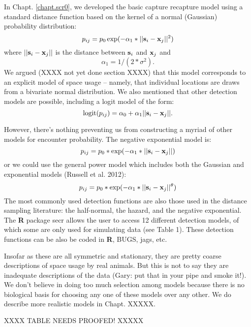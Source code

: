 In Chapt. \ref{chapt.scr0}, we developed the basic capture recapture model using  a
standard distance function based on the kernel of a normal (Gaussian) probability
distribution:
\[
p_{ij} = p_{0} \exp(-\alpha_{1} *||{\bf s}_{i}-{\bf x}_{j}||^2)
\]
where $||{\bf s}_{i}-{\bf x}_{j}||$ is the distance between ${\bf
  s}_{i}$ and ${\bf x}_{j}$ and
\[
\alpha_{1} = 1/(2*\sigma^2).
\]
We argued (XXXX not yet done section XXXX) that this model 
corresponds to an explicit model of space usage -- namely, that
individual locations are draws from a bivariate normal
distribution. We also mentioned that other detection models are
possible, including a logit model of the form:
\begin{equation}
	\mbox{logit}(p_{ij}) = \alpha_{0} + \alpha_1 ||{\bf s}_{i}-{\bf x}_{j} ||.
\label{covariates.eq.logit}
\end{equation}

However, there's nothing preventing us from constructing a myriad of
other models for encounter probability.
The negative exponential model is:
\[
p_{ij} = p_{0}*\exp(-\alpha_{1} *||{\bf s}_{i}-{\bf x}_{j}||)
\]
or we could use the general power model which includes both the
Gaussian and exponential models (Russell et al. 2012):
\[
p_{ij} = p_{0}*\exp(-\alpha_{1} *||{\bf s}_{i}-{\bf x}_{j}||^{\theta} )
\]
The most commonly used detection
functions are also those used in the distance sampling literature: the
half-normal, the hazard, and the negative exponential.  
The {\bf R} package
secr allows the user to access 12 different detection models, of which
some are only used for simulating data (see Table 1).  These detection
functions can be also be coded in {\bf R}, BUGS, jags, etc.  

Insofar as these are all symmetric and stationary, they are pretty
coarse descriptions of space usage by real animals. But this is not to
say they are inadequate descriptions of the data (Gary: put that in
your pipe and smoke it!).  We don't believe in doing too much
selection among models because there is no biological basis for
choosing any one of these models over any other. We do describe more
realistic models in Chapt. XXXXX.



XXXX TABLE NEEDS PROOFED! XXXXX

